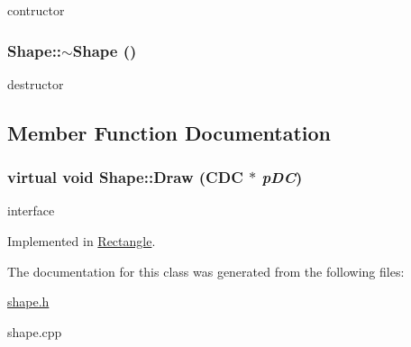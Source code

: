 contructor \hypertarget{classShape_935afc9e576015f967d90de56977167d}{
\subsubsection[$\sim$Shape]{\setlength{\rightskip}{0pt plus 5cm}Shape::$\sim$Shape ()}}
\label{classShape_935afc9e576015f967d90de56977167d}


destructor 

\subsection{Member Function Documentation}
\hypertarget{classShape_ef21058ba7bb2497796f678b0607cf5d}{
\subsubsection[Draw]{\setlength{\rightskip}{0pt plus 5cm}virtual void Shape::Draw (CDC $\ast$ {\em pDC})}}
\label{classShape_ef21058ba7bb2497796f678b0607cf5d}


interface 

Implemented in \hyperlink{classRectangle_22e5e5f9e3c7474d3586e1d7d36bb069}{Rectangle}.

The documentation for this class was generated from the following files:\begin{CompactItemize}
\item 
\hyperlink{shape_8h}{shape.h}\item 
shape.cpp\end{CompactItemize}
